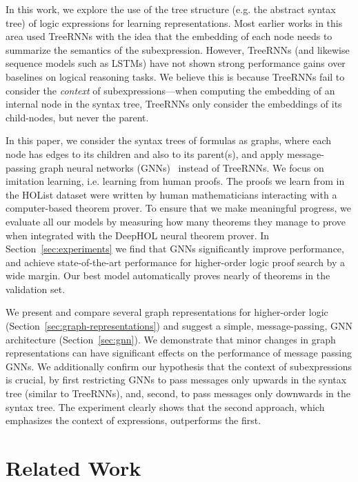\documentclass[letterpaper]{article} \usepackage{aaai20}  \usepackage{times}  \usepackage{helvet} \usepackage{courier}  \usepackage[hyphens]{url}  \usepackage{graphicx} \urlstyle{rm} \def\UrlFont{\rm}  \usepackage{graphicx}  \frenchspacing  \setlength{\pdfpagewidth}{8.5in}  \setlength{\pdfpageheight}{11in}
\newcommand{\citep}{\cite}
\begin{document}
In this work, we explore the use of the tree structure (e.g. the abstract syntax tree) of logic expressions for learning representations.
Most earlier works in this area used TreeRNNs with the idea that the embedding of each node needs to summarize the semantics of the subexpression.
However, TreeRNNs (and likewise sequence models such as LSTMs) have not shown strong performance gains over baselines on logical reasoning tasks.
We believe this is because TreeRNNs fail to consider the \emph{context} of subexpressions---when computing the embedding of an internal node in the syntax tree, TreeRNNs only consider the embeddings of its child-nodes, but never the parent.

In this paper, we consider the syntax trees of formulas as graphs, where each node has edges to its children and also to its parent(s), and apply message-passing graph neural networks (GNNs)~\citep{scarselli2009graph,li2015gated,GilmerSRVD17,gnn_survey_2019} instead of TreeRNNs.
We focus on imitation learning, i.e. learning from human proofs.
The proofs we learn from in the HOList dataset were written by human mathematicians interacting with a computer-based theorem prover.
To ensure that we make meaningful progress, we evaluate all our models by measuring how many theorems they manage to prove when integrated with the DeepHOL neural theorem prover.
In Section~\ref{sec:experiments} we find that GNNs significantly improve performance, and achieve state-of-the-art performance for higher-order logic proof search by a wide margin.
Our best model automatically proves nearly  of theorems in the validation set.

We present and compare several graph representations for higher-order logic (Section~\ref{sec:graph-representations}) and suggest a simple, message-passing, GNN architecture (Section~\ref{sec:gnn}).
We demonstrate that minor changes in graph representations can have significant effects on the performance of message passing GNNs.
We additionally confirm our hypothesis that the context of subexpressions is crucial, by first restricting GNNs to pass messages only upwards in the syntax tree (similar to TreeRNNs), and, second, to pass messages only downwards in the syntax tree.
The experiment clearly shows that the second approach, which emphasizes the context of expressions, outperforms the first.
 
\section{Related Work}
\label{sec:related-work}
\end{document}

